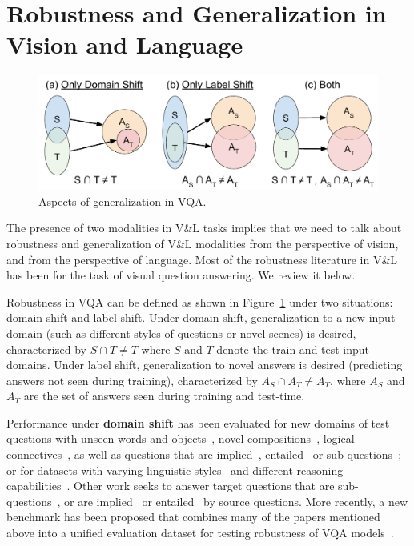 \section{Robustness and Generalization in Vision and Language}
\begin{figure}[t]
    \centering
    \includegraphics[width=\linewidth]{figures/generalization_types.pdf}
    \caption{Aspects of generalization in VQA.}
    \label{fig:generalization_types}
\end{figure}
The presence of two modalities in V\&L tasks implies that we need to talk about robustness and generalization of V\&L modalities from the perspective of vision, and from the perspective of language.
Most of the robustness literature in V\&L has been for the task of visual question answering.
We review it below.

Robustness in VQA can be defined as shown in Figure~\ref{fig:generalization_types} under two situations: domain shift and label shift.
Under domain shift, generalization to a new input domain (such as different styles of questions or novel scenes) is desired, characterized by $S\cap T \neq T$ where $S$ and $T$ denote the train and test input domains.
Under label shift, generalization to novel answers is desired (predicting answers not seen during training), characterized by $A_S\cap A_T \neq A_T$, where $A_S$ and $A_T$ are the set of answers seen during training and test-time.

Performance under \textbf{domain shift} has been evaluated for new domains of test questions with unseen words and objects~\citep{teney2016zero,ramakrishnan2017empirical}, 
novel compositions~\citep{johnson2017clevr,agrawal2017c}, 
logical connectives~\citep{gokhale2020vqa}, as well as questions that are
implied~\citep{ribeiro-etal-2019-red}, entailed~\citep{ray2019sunny} or sub-questions~\citep{selvaraju2020squinting}; or for datasets with varying linguistic styles~\citep{chao2018cross,xu2019open,shrestha2019answer}
and different reasoning capabilities~\citep{kafle2017analysis}.
Other work seeks to answer target questions that are sub-questions~\citep{selvaraju2020squinting}, or are implied~\citep{ribeiro-etal-2019-red} or entailed~\citep{ray2019sunny} by source questions.
More recently, a new benchmark has been proposed that combines many of the papers mentioned above into a unified evaluation dataset for testing robustness of VQA models~\citep{li2020closer}.


